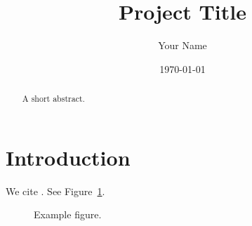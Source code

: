 \documentclass[11pt]{article}
\title{Project Title}
\author{Your Name}
\date{\today}
\begin{document}
\maketitle
\begin{abstract}A short abstract.\end{abstract}

\section{Introduction}
We cite \citep{smith2023example}. See Figure~\ref{fig:ex}.

\begin{figure}[h]\centering

\caption{Example figure.}\label{fig:ex}
\end{figure}



\end{document}
